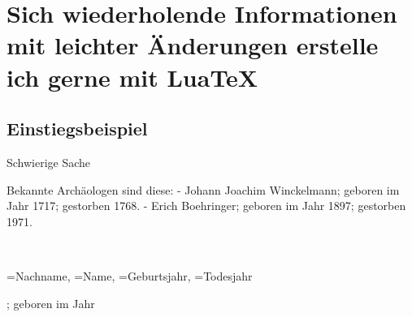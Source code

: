 
\chapter[Infos]{Sich wiederholende Informationen mit leichter Änderungen erstelle ich gerne mit LuaTeX}
\section{Einstiegsbeispiel}
Schwierige Sache

Bekannte Archäologen sind diese:
- Johann Joachim Winckelmann; geboren im Jahr 1717; gestorben 1768.
- Erich Boehringer; geboren im Jahr 1897; gestorben 1971.

\pagebreak
{}%
\\

\begin{itemize}
{\nachname=Nachname,%
\name=Name,%
\geburtsjahr=Geburtsjahr,%
\todesjahr=Todesjahr%
}
{\item \name\xspace \nachname;
geboren im Jahr \geburtsjahr\ifdefempty{}
}
\end{itemize}



